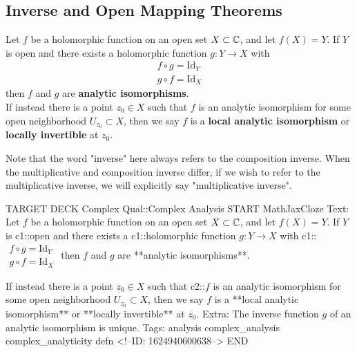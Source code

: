 \documentclass{memoir}
\begin{document}


\subsection{Inverse and Open Mapping Theorems}
\label{sub:inverse_and_open_mapping_theorems}

\begin{defn}
	Let \(f\) be a holomorphic function on an open set \(X\subset \mathbb{C}\), and let \(f(X )=Y\). If \(Y\) is open and there exists a holomorphic function \(g:Y\to X\) with
	\begin{align*}
		f\circ g = \textrm{Id}_Y\\
		g \circ f = \textrm{Id}_X
	\end{align*}
	then \(f\) and \(g\) are \textbf{analytic isomorphisms}.\\

	If instead there is a point \(z_0 \in X\) such that \(f\) is an analytic isomorphism for some open neighborhood \(U_{z_0}\subset X\), then we say \(f\) is a \textbf{local analytic isomorphism} or \textbf{locally invertible} at \(z_0\).
\end{defn}
Note that the word "inverse" here always refers to the composition inverse. When the multiplicative and composition inverse differ, if we wish to refer to the multiplicative inverse, we will explicitly say "multiplicative inverse".

\begin{anki}
TARGET DECK
Complex Qual::Complex Analysis
START
MathJaxCloze
Text: Let \(f\) be a holomorphic function on an open set \(X\subset \mathbb{C}\), and let \(f(X )=Y\). If \(Y\) is {{c1::open}} and there exists a {{c1::holomorphic function \(g:Y\to X\)}} with
{{c1::\(\begin{align*}
        	f\circ g = \textrm{Id}_Y\\
        	g \circ f = \textrm{Id}_X
        \end{align*}\)}} 
	then \(f\) and \(g\) are **analytic isomorphisms**.

	If instead there is a point \(z_0 \in X\) such that {{c2::\(f\) is an analytic isomorphism for some open neighborhood \(U_{z_0}\subset X\)}}, then we say \(f\) is a **local analytic isomorphism** or **locally invertible** at \(z_0\).
Extra: The inverse function \(g\) of an analytic isomorphism is unique.
Tags: analysis complex_analysis complex_analyticity defn
<!--ID: 1624940600638-->
END
\end{anki}
\end{document}
